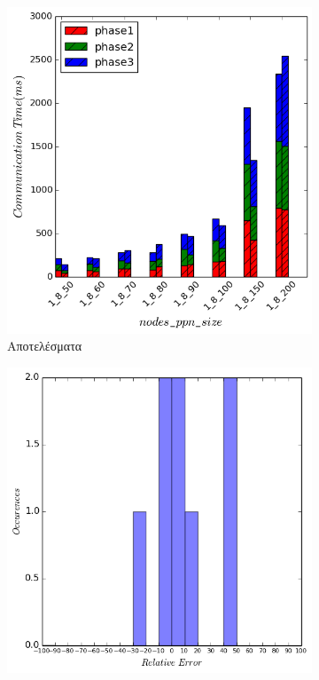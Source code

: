 \begin{figure}[H]
    \centering
    \captionsetup{justification=centering,margin=0cm,font=footnotesize}
    \begin{subfigure}[b]{0.47\textwidth}
        \includegraphics[width=\textwidth]{./images/NB+cg_avgonly_UMA/lulesh_res.png}
        \caption{Αποτελέσματα}
    \end{subfigure}
    \quad %
    \begin{subfigure}[b]{0.47\textwidth}
        \includegraphics[width=\textwidth]{./images/NB+cg_avgonly_UMA/lulesh_err_dist.png}

\end{subfigure}
\end{figure}
